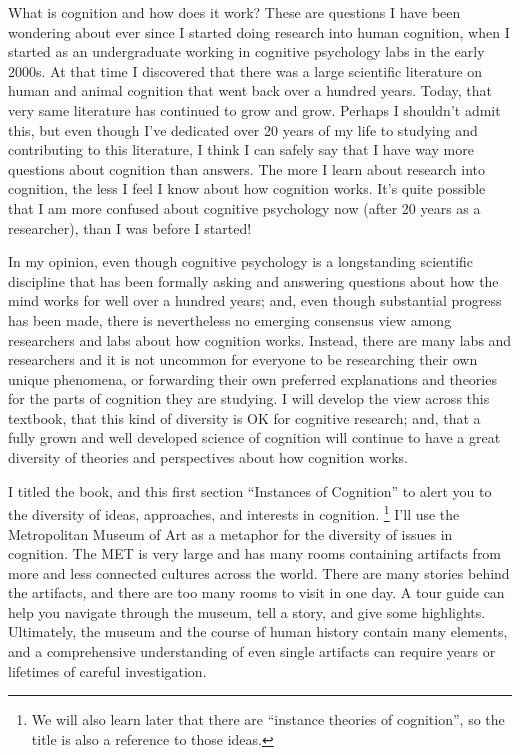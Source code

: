 \documentclass[
  oneside,
  12pt]{crumpbook}
\begin{document}
What is cognition and how does it work? These are questions I have been wondering about ever since I started doing research into human cognition, when I started as an undergraduate working in cognitive psychology labs in the early 2000s. At that time I discovered that there was a large scientific literature on human and animal cognition that went back over a hundred years. Today, that very same literature has continued to grow and grow. Perhaps I shouldn't admit this, but even though I've dedicated over 20 years of my life to studying and contributing to this literature, I think I can safely say that I have way more questions about cognition than answers. The more I learn about research into cognition, the less I feel I know about how cognition works. It's quite possible that I am more confused about cognitive psychology now (after 20 years as a researcher), than I was before I started!

In my opinion, even though cognitive psychology is a longstanding scientific discipline that has been formally asking and answering questions about how the mind works for well over a hundred years; and, even though substantial progress has been made, there is nevertheless no emerging consensus view among researchers and labs about how cognition works. Instead, there are many labs and researchers and it is not uncommon for everyone to be researching their own unique phenomena, or forwarding their own preferred explanations and theories for the parts of cognition they are studying. I will develop the view across this textbook, that this kind of diversity is OK for cognitive research; and, that a fully grown and well developed science of cognition will continue to have a great diversity of theories and perspectives about how cognition works.

I titled the book, and this first section ``Instances of Cognition'' to alert you to the diversity of ideas, approaches, and interests in cognition. \footnote{We will also learn later that there are ``instance theories of cognition'', so the title is also a reference to those ideas.} I'll use the Metropolitan Museum of Art as a metaphor for the diversity of issues in cognition. The MET is very large and has many rooms containing artifacts from more and less connected cultures across the world. There are many stories behind the artifacts, and there are too many rooms to visit in one day. A tour guide can help you navigate through the museum, tell a story, and give some highlights. Ultimately, the museum and the course of human history contain many elements, and a comprehensive understanding of even single artifacts can require years or lifetimes of careful investigation.
\end{document}
